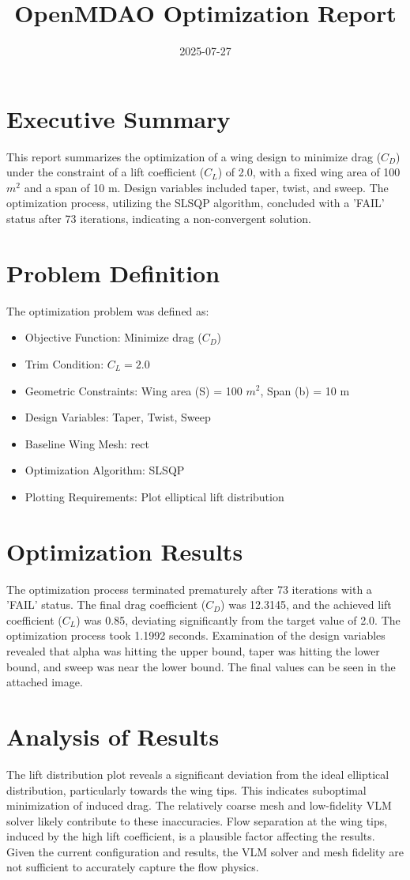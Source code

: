 \documentclass{article}
\title{OpenMDAO Optimization Report}
\date{2025-07-27}
\begin{document}
\maketitle

\section{Executive Summary}
This report summarizes the optimization of a wing design to minimize drag ($C_D$) under the constraint of a lift coefficient ($C_L$) of 2.0, with a fixed wing area of 100 $m^2$ and a span of 10 m. Design variables included taper, twist, and sweep. The optimization process, utilizing the SLSQP algorithm, concluded with a 'FAIL' status after 73 iterations, indicating a non-convergent solution.

\section{Problem Definition}
The optimization problem was defined as:
\begin{itemize}
    \item Objective Function: Minimize drag ($C_D$)
    \item Trim Condition: $C_L = 2.0$
    \item Geometric Constraints: Wing area (S) = 100 $m^2$, Span (b) = 10 m
    \item Design Variables: Taper, Twist, Sweep
    \item Baseline Wing Mesh: rect
    \item Optimization Algorithm: SLSQP
    \item Plotting Requirements: Plot elliptical lift distribution
\end{itemize}

\section{Optimization Results}
The optimization process terminated prematurely after 73 iterations with a 'FAIL' status. The final drag coefficient ($C_D$) was 12.3145, and the achieved lift coefficient ($C_L$) was 0.85, deviating significantly from the target value of 2.0. The optimization process took 1.1992 seconds. Examination of the design variables revealed that alpha was hitting the upper bound, taper was hitting the lower bound, and sweep was near the lower bound. The final values can be seen in the attached image.

\section{Analysis of Results}
The lift distribution plot reveals a significant deviation from the ideal elliptical distribution, particularly towards the wing tips. This indicates suboptimal minimization of induced drag. The relatively coarse mesh and low-fidelity VLM solver likely contribute to these inaccuracies. Flow separation at the wing tips, induced by the high lift coefficient, is a plausible factor affecting the results. Given the current configuration and results, the VLM solver and mesh fidelity are not sufficient to accurately capture the flow physics.
\end{document}
